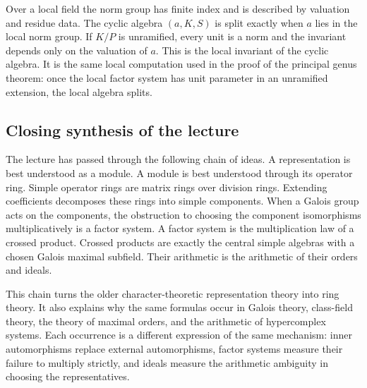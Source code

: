 \documentclass[12pt]{article}
\begin{document}
Over a local field the norm group has finite index and is described by valuation and residue data. The cyclic algebra \((a,K,S)\) is split exactly when \(a\) lies in the local norm group. If \(K/P\) is unramified, every unit is a norm and the invariant depends only on the valuation of \(a\). This is the local invariant of the cyclic algebra. It is the same local computation used in the proof of the principal genus theorem: once the local factor system has unit parameter in an unramified extension, the local algebra splits.

\subsection{Closing synthesis of the lecture}

The lecture has passed through the following chain of ideas. A representation is best understood as a module. A module is best understood through its operator ring. Simple operator rings are matrix rings over division rings. Extending coefficients decomposes these rings into simple components. When a Galois group acts on the components, the obstruction to choosing the component isomorphisms multiplicatively is a factor system. A factor system is the multiplication law of a crossed product. Crossed products are exactly the central simple algebras with a chosen Galois maximal subfield. Their arithmetic is the arithmetic of their orders and ideals.

This chain turns the older character-theoretic representation theory into ring theory. It also explains why the same formulas occur in Galois theory, class-field theory, the theory of maximal orders, and the arithmetic of hypercomplex systems. Each occurrence is a different expression of the same mechanism: inner automorphisms replace external automorphisms, factor systems measure their failure to multiply strictly, and ideals measure the arithmetic ambiguity in choosing the representatives.
\end{document}
